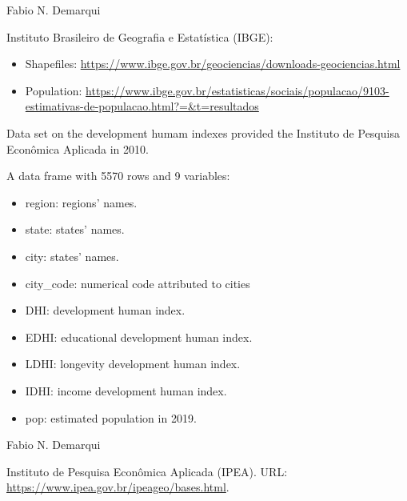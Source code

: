 \documentclass[letterpaper]{book}
\begin{document}
%
\begin{Author}\relax
Fabio N. Demarqui 
\end{Author}
%
\begin{Source}\relax
Instituto Brasileiro de Geografia e Estatística (IBGE):
\begin{itemize}

\item{} Shapefiles: \url{https://www.ibge.gov.br/geociencias/downloads-geociencias.html}
\item{} Population: \url{https://www.ibge.gov.br/estatisticas/sociais/populacao/9103-estimativas-de-populacao.html?=&t=resultados}

\end{itemize}

\end{Source}
%
\begin{Description}\relax
Data set on the development humam indexes provided the Instituto de Pesquisa Econômica Aplicada in 2010.
\end{Description}
%
\begin{Format}
A data frame with 5570 rows and 9 variables:
\begin{itemize}

\item{} region: regions' names.
\item{} state: states' names.
\item{} city: states' names.
\item{} city\_code: numerical code attributed to cities
\item{} DHI: development human index.
\item{} EDHI: educational development human index.
\item{} LDHI: longevity development human index.
\item{} IDHI: income development human index.
\item{} pop: estimated population in 2019.

\end{itemize}

\end{Format}
%
\begin{Author}\relax
Fabio N. Demarqui 
\end{Author}
%
\begin{Source}\relax
Instituto de Pesquisa Econômica Aplicada (IPEA). URL: \url{https://www.ipea.gov.br/ipeageo/bases.html}.
\end{Source}
\end{document}
